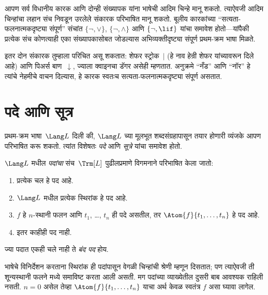 \begin{explain}
आपण सर्व विधानीय कारक आणि दोन्ही संख्यापक यांना भाषेची आदिम चिन्हे
मानू शकतो. त्याऐवजी आदिम चिन्हांचा लहान संच निवडून उरलेले
संकारक परिभाषित मानू शकतो. बूलीय कारकांच्या
``सत्यता-फलनात्मकदृष्ट्या संपूर्ण'' संचांत $\{ \lnot, \lor \}$,
$\{ \lnot, \land \}$ आणि $\{ \lnot,
\lif\}$ यांचा समावेश होतो---यांपैकी प्रत्येक संच कोणत्याही एका
संख्यापकासोबत जोडल्यास अभिव्यक्तीदृष्ट्या संपूर्ण प्रथम-क्रम भाषा मिळते.

इतर दोन संकारक तुम्हाला परिचित असू शकतात: शेफर स्ट्रोक~$|$
(हे नाव हेन्री शेफर यांच्यावरून दिले आहे) आणि पिअर्स बाण~$\downarrow$,
ज्याला क्वाइनचा डॅगर असेही म्हणतात. अनुक्रमे ``नँड'' आणि ``नॉर'' हे
त्यांचे नेहमीचे वाचन दिल्यास, हे कारक स्वतःच सत्यता-फलनात्मकदृष्ट्या
संपूर्ण असतात.
\end{explain}












\section{पदे आणि सूत्र}\label{fol:syn:frm:sec}

प्रथम-क्रम भाषा~$\Lang L$ दिली की, $\Lang L$ च्या मूलभूत
शब्दसंग्रहापासून तयार होणारी व्यंजके आपण परिभाषित करू शकतो. त्यांत
विशेषतः \emph{पदे} आणि \emph{सूत्रे} यांचा समावेश होतो.

\begin{defn}[पदे]
\label{fol:syn:frm:defn:terms}
$\Lang L$ मधील \emph{पदांचा} संच~$\Trm[L]$ पुढीलप्रमाणे विगमनाने
परिभाषित केला जातो:
\begin{enumerate}
\item प्रत्येक चल हे पद आहे.
\item $\Lang L$ मधील प्रत्येक स्थिरांक हे पद आहे.
\item $f$ हे $n$-स्थानी फलन आणि $t_1$, \dots, $t_n$ ही
  पदे असतील, तर $\Atom{f}{t_1, \ldots, t_n}$ हे पद आहे.
\item
  इतर काहीही पद नाही.
\end{enumerate}
ज्या पदात एकही चले नाही ते \emph{बंद पद} होय.
\end{defn}

\begin{explain}
भाषेचे विनिर्देशन करताना स्थिरांक ही पदांपासून वेगळी चिन्हांची
श्रेणी म्हणून दिसतात; पण त्याऐवजी ती शून्यस्थानी फलने मध्ये
समाविष्ट करता आली असती. मग पदांच्या व्याख्येतील दुसरी बाब आवश्यक
राहिली नसती. $n = 0$ असेल तेव्हा $\Atom{f}{t_1, \ldots, t_n}$ याचा
अर्थ केवळ स्वतंत्र $f$ असा घ्यावा लागेल.
\end{explain}

